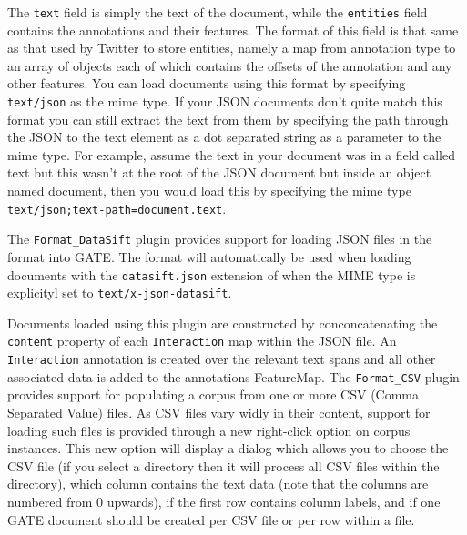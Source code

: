 The \texttt{text} field is simply the text of the document, while the
\texttt{entities} field contains the annotations and their features. The
format of this field is that same as that used by Twitter to store entities,
namely a map from annotation type to an array of objects each of which contains
the offsets of the annotation and any other features. You can load documents
using this format by specifying \texttt{text/json} as the mime type. If your
JSON documents don't quite match this format you can still extract the text
from them by specifying the path through the JSON to the text element as a
dot separated string as a parameter to the mime type. For example, assume
the text in your document was in a field called text but this wasn't at the
root of the JSON document but inside an object named document, then you would
load this by specifying the mime type \texttt{text/json;text-path=document.text}.

%
%
The \verb!Format_DataSift! plugin provides support for loading JSON files in the
 format into GATE. The format will
automatically be used when loading documents with the \verb!datasift.json!
extension of when the MIME type is explicityl set to \verb!text/x-json-datasift!.

Documents loaded using this plugin are constructed by conconcatenating the
\verb!content! property of each \verb!Interaction! map within the JSON file.
An \verb!Interaction! annotation is created over the relevant text spans and
all other associated data is added to the annotations FeatureMap.
%
%
The \verb!Format_CSV! plugin provides support for populating a corpus from one
or more CSV (Comma Separated Value) files. As CSV files vary widly in their
content, support for loading such files is provided through a new right-click
option on corpus instances. This new option will display a dialog which allows
you to choose the CSV file (if you select a directory then it will process all
CSV files within the directory), which column contains the text data (note that
the columns are numbered from 0 upwards), if the first row contains column labels,
and if one GATE document should be created per CSV file or per row within a file.

